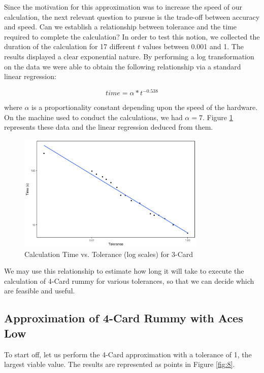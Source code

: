 \documentclass[letter,12pt]{article}
\begin{document}
Since the motivation for this approximation was to increase the speed of our calculation, the next relevant question to pursue is the trade-off between accuracy and speed. Can we establish a relationship between tolerance and the time required to complete the calculation? In order to test this notion, we collected the duration of the calculation for 17 different $t$ values between 0.001 and 1. The results displayed a clear exponential nature. By performing a log transformation on the data we were able to obtain the following relationship via a standard linear regression:

$$time = \alpha * t^{-0.538}$$

where $\alpha$ is a proportionality constant depending upon the speed of the hardware. On the machine used to conduct the calculations, we had $\alpha = 7$. Figure \ref{fig:7} represents these data and the linear regression deduced from them.

\begin{figure}
\centering
\includegraphics[width=0.8\textwidth]{fig7.png}
\caption{Calculation Time vs. Tolerance (log scales) for 3-Card}\label{fig:7}
\end{figure}


We may use this relationship to estimate how long it will take to execute the calculation of 4-Card rummy for various tolerances, so that we can decide which are feasible and useful.

\subsection{Approximation of 4-Card Rummy with Aces Low}

To start off, let us perform the 4-Card approximation with a tolerance of 1, the largest viable value. The results are represented as points in Figure \ref{fig:8}.
\end{document}
